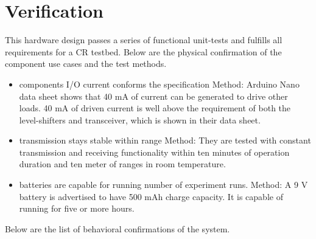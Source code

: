 \section{Verification}

This hardware design passes a series of functional unit-tests and fulfills all requirements for a CR testbed. Below are the physical confirmation of the component use cases and the test methods.

\begin{itemize}
  \item components I/O current conforms the specification\newline
  Method: Arduino Nano data sheet shows that 40 mA of current can be generated to drive other loads. 40 mA of driven current is well above the requirement of both the level-shifters and transceiver, which is shown in their data sheet.
  \item transmission stays stable within range\newline
  Method: They are tested with constant transmission and receiving functionality within ten minutes of operation duration and ten meter of ranges in room temperature.
  \item batteries are capable for running number of experiment runs.\newline
  Method: A 9 V battery is advertised to have 500 mAh charge capacity. It is capable of running for five or more hours.
\end{itemize}

Below are the list of behavioral confirmations of the system.

